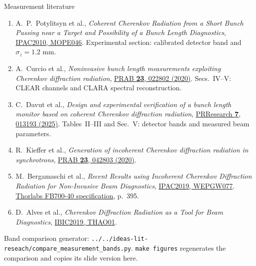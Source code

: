 \documentclass[10pt,aspectratio=169]{beamer}
\begin{document}
\begin{frame}{Measurement literature}
\begin{enumerate}\footnotesize
\setcounter{enumi}{4}
  \item A.~P.~Potylitsyn et al., \emph{Coherent Cherenkov Radiation from a Short
  Bunch Passing near a Target and Possibility of a Bunch Length Diagnostics},
  \href{https://accelconf.web.cern.ch/IPAC10/papers/mope046.pdf}{IPAC2010, MOPE046}.
  Experimental section: calibrated detector band and \(\sigma_z=1.2\) mm.
  \item A.~Curcio et al., \emph{Noninvasive bunch length measurements exploiting
  Cherenkov diffraction radiation},
  \href{https://doi.org/10.1103/PhysRevAccelBeams.23.022802}{PRAB \textbf{23}, 022802 (2020)}.
  Secs.~IV--V: CLEAR channels and CLARA spectral reconstruction.
  \item C.~Davut et al., \emph{Design and experimental verification of a bunch
  length monitor based on coherent Cherenkov diffraction radiation},
  \href{https://doi.org/10.1103/PhysRevResearch.7.013193}{PRResearch \textbf{7}, 013193 (2025)}.
  Tables~II--III and Sec.~V: detector bands and measured beam parameters.
  \item R.~Kieffer et al., \emph{Generation of incoherent Cherenkov diffraction
  radiation in synchrotrons},
  \href{https://doi.org/10.1103/PhysRevAccelBeams.23.042803}{PRAB \textbf{23}, 042803 (2020)}.
  \item M.~Bergamaschi et al., \emph{Recent Results using Incoherent Cherenkov
  Diffraction Radiation for Non-Invasive Beam Diagnostics},
  \href{https://proceedings.jacow.org/ipac2019/papers/wepgw077.pdf}{IPAC2019, WEPGW077}.
  \href{https://www.thorlabs.com/catalogpages/V21/395.pdf}{Thorlabs FB700-40 specification}, p.~395.
  \item D.~Alves et al., \emph{Cherenkov Diffraction Radiation as a Tool for Beam
  Diagnostics},
  \href{https://proceedings.jacow.org/ibic2019/papers/thao01.pdf}{IBIC2019, THAO01}.
\end{enumerate}
\vfill
\scriptsize Band comparison generator: \texttt{../../ideas-lit-reseach/compare\_measurement\_bands.py}.
\texttt{make figures} regenerates the comparison and copies its slide version here.
\end{frame}
\end{document}
